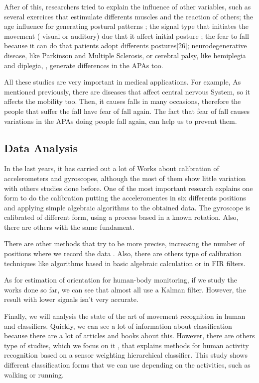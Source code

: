 After of this, researchers tried to explain the influence of other variables, such as several exercices that estimulate differents muscles and the reaction of others\cite{Gay2011}; the age influence for generating postural patterns \cite{Bleuse2006} \cite{Estelle2008}; the signal type that initiates the movement ( visual or auditory) due that it affect initial posture \cite{Mcllroy1993}\cite{Antonia2009}\cite{Vicent1999}\cite{Tard2013}; the fear to fall because it can do that patients adopt differents postures[26]; neurodegenerative disease, like Parkinson and Multiple Sclerosis\cite{Mancini2009}\cite{Jebb2008}\cite{Chris2005}\cite{Hall2013}, or cerebral palsy, like hemiplegia and diplegia, \cite{Hall2013}, generate differences in the APAs too.

All these studies are very important in medical applications. For example, As mentioned previously, there are diseases that affect central nervous System, so it affects  the mobility too. Then, it causes falls in many occasions, therefore  the people that suffer the fall have fear of fall again. The fact that fear of fall causes variations in the APAs doing people  fall again, can help us to prevent them.

\subsection{Data Analysis}

In the last years, it has carried out a lot of Works about  calibration of accelerometers and gyroscopes, although the most of them show little variation with others studies done before. One of the most important research  \cite{Kian2011}explains one form to do the calibration putting the acceleromentes in six differents positions and applying  simple algebraic algorithms to the obtained data. The gyroscope is calibrated of different form, using a process based in a known rotation. Also, there are others with the same fundament.

There are other methods that try to be more precise, increasing the number of positions where we record the data \cite{Camps2009}. Also, there are others type of calibration techniques like algorithms based in basic algebraic calculation or in FIR filters. \cite{A.Olivares2013}

As for estimation of orientation for human-body monitoring, if we study the works done so far, we can see that almost all  use a Kalman filter. However, the result with lower signals isn’t very accurate.\cite{A.Olivares2013}

Finally, we will analysis the state of the art of movement recognition in human and classifiers. Quickly, we can see a lot of information about classification because there are a lot of articles and books about this. However, there are others type of studies, which we focus on  it \cite{Banos2012}, that explains methods for human activity recognition based on a sensor weighting hierarchical classifier. This study shows different classification forms that we can use depending on the activities, such as walking or running.

